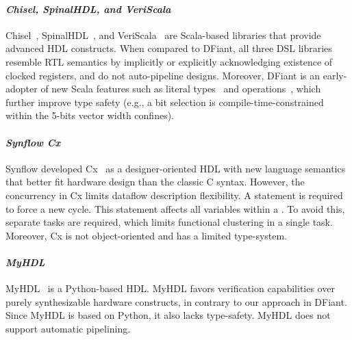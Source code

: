 \paragraph*{\bf \em Chisel, SpinalHDL, and VeriScala}
Chisel~\cite{Bachrach2012}, SpinalHDL~\cite{Charles2016}, and VeriScala~\cite{Liu2017} are Scala-based libraries that provide advanced HDL constructs. When compared to DFiant, all three DSL libraries resemble RTL semantics by implicitly or explicitly acknowledging existence of clocked registers, and do not auto-pipeline designs. Moreover, DFiant is an early-adopter of new Scala features such as literal types~\cite{TypeLevelScala} and operations~\cite{singleton-ops}, which further improve type safety (e.g., a  bit selection is compile-time-constrained within the 5-bits vector width confines).


\paragraph*{\bf \em Synflow Cx} 
Synflow developed Cx~\cite{CxLang2014} as a designer-oriented HDL with new language semantics that better fit hardware design than the classic C syntax.
However, the concurrency in Cx limits dataflow description flexibility. A  statement is required to force a new cycle. This statement affects all variables within a . To avoid this, separate tasks are required, which limits functional clustering in a single task.
Moreover, Cx is not object-oriented and has a limited type-system.

\paragraph*{\bf \em MyHDL}
MyHDL~\cite{decaluwe2004myhdl} is a Python-based HDL. MyHDL favors verification capabilities over purely synthesizable hardware constructs, in contrary to our approach in DFiant. Since MyHDL is based on Python, it also lacks type-safety. MyHDL does not support automatic pipelining.


